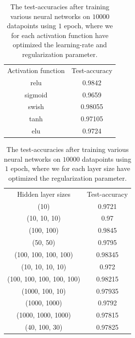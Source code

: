 \documentclass{article}
\begin{document}
\begin{table}
	\centering
	\begin{tabular}{| c | c |}
		Activation function & Test-accuracy \\
		relu                & 0.9842        \\
		sigmoid             & 0.9659        \\
		swish               & 0.98055       \\
		tanh                & 0.97105       \\
		elu                 & 0.9724
	\end{tabular}
	\caption{The test-accuracies after training various neural networks on
		$10 000$ datapoints using $1$ epoch, where we for each activation
		function have optimized the learning-rate and regularization parameter.}
	\label{nnactivres}
\end{table}
\begin{table}
	\centering
	\begin{tabular}{| c | c |}
		Hidden layer sizes        & Test-accuracy \\
		(10)                      & 0.9721        \\
		(10, 10, 10)              & 0.97          \\
		(100, 100)                & 0.9845        \\
		(50, 50)                  & 0.9795        \\
		(100, 100, 100, 100)      & 0.98345       \\
		(10, 10, 10, 10)          & 0.972         \\
		(100, 100, 100, 100, 100) & 0.98215       \\
		(1000, 100, 10)           & 0.97935       \\
		(1000, 1000)              & 0.9792        \\
		(1000, 1000, 1000)        & 0.97815       \\
		(40, 100, 30)             & 0.97825
	\end{tabular}
	\caption{The test-accuracies after training various neural networks on
		$10 000$ datapoints using $1$ epoch, where we for each layer
		size have optimized the regularization parameter.}
	\label{nnsizeres}
\end{table}
\end{document}
